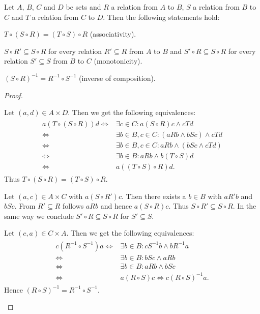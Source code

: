 \begin{theorem}
    Let $A$, $B$, $C$ and $D$ be sets and $R$ a relation from $A$ to $B$, $S$ a relation from $B$ to $C$ and $T$ a relation from $C$ to $D$. Then the following statements hold:
    \begin{intheoremenumerate}
        \item $T\circ (S\circ R)=(T\circ S)\circ R$ (associativity).
        \item $S\circ R'\subseteq S\circ R$ for every relation $R'\subseteq R$ from $A$ to $B$ and $S'\circ R\subseteq S\circ R$ for every relation $S'\subseteq S$ from $B$ to $C$ (monotonicity).
        \item $(S\circ R)^{-1}=R^{-1}\circ S^{-1}$ (inverse of composition).
    \end{intheoremenumerate}
\end{theorem}

\begin{proof}
    \begin{proofenumerate}
        \item Let $(a,d)\in A\times D$. Then we get the following equivalences:
        \begin{align}\begin{split}
            a (T\circ (S\circ R)) d \iff & \exists c\in C\colon a (S\circ R) c\land c T d\\
            \iff & \exists b\in B,c\in C\colon (a R b\land b S c)\land c T d\\
            \iff & \exists b\in B,c\in C\colon a R b\land (b S c\land c T d)\\
            \iff & \exists b\in B\colon a R b\land b (T\circ S) d\\
            \iff & a ((T\circ S)\circ R) d.
        \end{split}\end{align}
        Thus $T\circ (S\circ R)=(T\circ S)\circ R$.
        \item Let $(a,c)\in A\times C$ with $a (S\circ R') c$. Then there exists a $b\in B$ with $a R' b$ and $b S c$. From $R'\subseteq R$ follows $a R b$ and hence $a (S\circ R) c$. Thus $S\circ R'\subseteq S\circ R$. In the same way we conclude $S'\circ R\subseteq S\circ R$ for $S'\subseteq S$.
        \item Let $(c,a)\in C\times A$. Then we get the following equivalences:
        \begin{align}\begin{split}
            c (R^{-1}\circ S^{-1}) a \iff& \exists b\in B\colon c S^{-1} b \land b R^{-1} a\\
            \iff& \exists b\in B\colon b S c \land a R b\\
            \iff& \exists b\in B\colon a R b \land b S c\\
            \iff& a (R\circ S) c\iff c(R\circ S)^{-1} a.
        \end{split}\end{align}
        Hence $(R\circ S)^{-1}=R^{-1}\circ S^{-1}$.
    \end{proofenumerate}
\end{proof}

